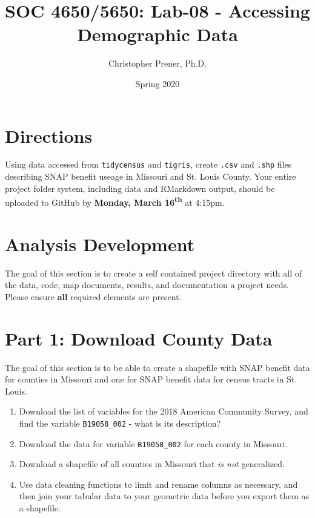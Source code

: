 \documentclass{tufte-handout}
\title{SOC 4650/5650: Lab-08 - Accessing Demographic Data}
\author{Christopher Prener, Ph.D.}
\date{Spring 2020}
\begin{document}
\maketitle %

\vspace{5mm}
\section{Directions}
Using data accessed from \texttt{tidycensus} and \texttt{tigris}, create \texttt{.csv} and \texttt{.shp} files describing SNAP benefit useage in Missouri and St. Louis County. Your entire project folder system, including data and RMarkdown output, should be uploaded to GitHub by \textbf{Monday, March 16\textsuperscript{th}} at 4:15pm.

\section{Analysis Development}
The goal of this section is to create a self contained project directory with all of the data, code, map documents, results, and documentation a project needs. Please ensure \textbf{all} required elements are present.

\vspace{5mm}
\section{Part 1: Download County Data}
The goal of this section is to be able to create a shapefile with SNAP benefit data for counties in Missouri and one for SNAP benefit data for census tracts in St. Louis.
\begin{enumerate}
\item Download the list of variables for the 2018 American Community Survey, and find the variable \texttt{B19058\_002} - what is its description?
\item Download the data for variable \texttt{B19058\_002} for each county in Missouri.
\item Download a shapefile of all counties in Missouri that \textit{is not} generalized. 
\item Use data cleaning functions to limit and rename columns as necessary, and then join your tabular data to your geometric data before you export them as a shapefile.
\end{enumerate}
\end{document}
